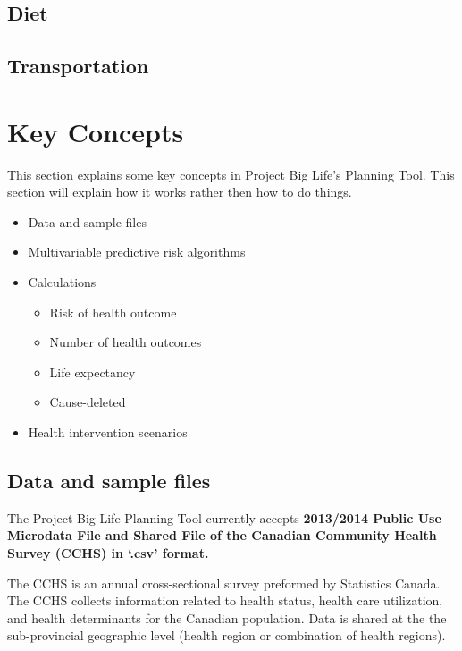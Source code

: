 \documentclass[]{book}
\providecommand{\tightlist}{%
  \setlength{\itemsep}{0pt}\setlength{\parskip}{0pt}}
\begin{document}
\section{Diet}\label{diet}

\section{Transportation}\label{transportation}

\chapter{Key Concepts}\label{keyconcepts}

This section explains some key concepts in Project Big Life's Planning
Tool. This section will explain how it works rather then how to do
things.

\begin{itemize}
\item
  Data and sample files
\item
  Multivariable predictive risk algorithms
\item
  Calculations

  \begin{itemize}
  \tightlist
  \item
    Risk of health outcome
  \item
    Number of health outcomes
  \item
    Life expectancy
  \item
    Cause-deleted
  \end{itemize}
\item
  Health intervention scenarios
\end{itemize}

\section{Data and sample files}\label{data-and-sample-files}

The Project Big Life Planning Tool currently accepts \textbf{2013/2014
Public Use Microdata File and Shared File of the Canadian Community
Health Survey (CCHS) in `.csv' format.}

The CCHS is an annual cross-sectional survey preformed by Statistics
Canada. The CCHS collects information related to health status, health
care utilization, and health determinants for the Canadian population.
Data is shared at the the sub-provincial geographic level (health region
or combination of health regions).
\end{document}
